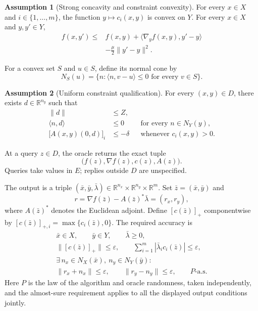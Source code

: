 \documentclass[10pt]{article}
\theoremstyle{definition}
\newtheorem{assumption}{Assumption}
\begin{document}
\begin{assumption}[Strong concavity and constraint convexity]
For every $x\in X$ and $i\in\{1,\ldots,m\}$, the function $y\mapsto c_i(x,y)$ is convex on $Y$. For every $x\in X$ and $y,y'\in Y$,
\[
\begin{aligned}
f(x,y')\leq{}&f(x,y)+\langle\nabla_y f(x,y),y'-y\rangle\\
&-\frac{\mu}{2}\|y'-y\|^2.
\end{aligned}
\]
\end{assumption}

For a convex set $S$ and $u\in S$, define its normal cone by
\[
N_S(u)=\{n:\langle n,v-u\rangle\leq0\text{ for every }v\in S\}.
\]
\begin{assumption}[Uniform constraint qualification]
For every $(x,y)\in D$, there exists $d\in\mathbb{R}^{n_y}$ such that
\[
\begin{aligned}
\|d\|&\leq Z,\\
\langle n,d\rangle&\leq0 &&\text{for every }n\in N_Y(y),\\
\bigl[A(x,y)(0,d)\bigr]_i&\leq-\delta
&&\text{whenever }c_i(x,y)>0.
\end{aligned}
\]
\end{assumption}

At a query $z\in D$, the oracle returns the exact tuple
\[
\bigl(f(z),\nabla f(z),c(z),A(z)\bigr).
\]
Queries take values in $E$; replies outside $D$ are unspecified.

The output is a triple $(\bar{x},\bar{y},\bar{\lambda})\in\mathbb{R}^{n_x}\times\mathbb{R}^{n_y}\times\mathbb{R}^{m}$. Set $\bar{z}=(\bar{x},\bar{y})$ and
\[
r=\nabla f(\bar{z})-A(\bar{z})^*\bar{\lambda}
  =(r_x,r_y),
\]
where $A(\bar{z})^*$ denotes the Euclidean adjoint. Define $[c(\bar{z})]_+$ componentwise by $[c(\bar{z})]_{+,i}=\max\{c_i(\bar{z}),0\}$. The required accuracy is
\[
\begin{gathered}
\bar{x}\in X,\qquad \bar{y}\in Y,\qquad \bar{\lambda}\geq0,\\
\|[c(\bar{z})]_+\|\leq\varepsilon,\qquad
\sum_{i=1}^{m}|\bar{\lambda}_i c_i(\bar{z})|\leq\varepsilon,\\
\exists\, n_x\in N_X(\bar{x}),\ n_y\in N_Y(\bar{y}):\\
\|r_x+n_x\|\leq\varepsilon,\qquad
\|r_y-n_y\|\leq\varepsilon,
\qquad P\text{-a.s.}
\end{gathered}
\]
Here $P$ is the law of the algorithm and oracle randomness, taken independently, and the almost-sure requirement applies to all the displayed output conditions jointly.
\end{document}
